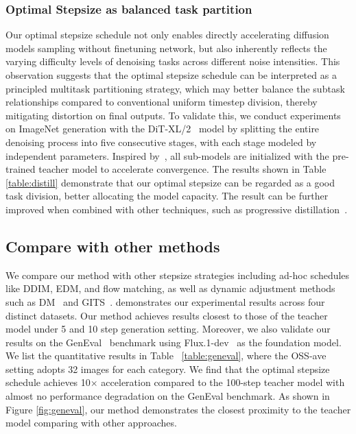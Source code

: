 \documentclass[10pt,twocolumn,letterpaper]{article}
\begin{document}
\subsubsection{Optimal Stepsize as balanced task partition}
Our optimal stepsize schedule not only enables directly accelerating diffusion models sampling without finetuning network, but also inherently reflects the varying difficulty levels of denoising tasks across different noise intensities. This observation suggests that the optimal stepsize schedule can be interpreted as a principled multitask partitioning strategy, which may better balance the subtask relationships compared to conventional uniform timestep division, thereby mitigating distortion on final outputs. To validate this, we conduct experiments on ImageNet generation with the DiT-XL/2~\cite{dit} model by splitting the entire denoising process into five consecutive stages, with each stage modeled by independent parameters. Inspired by~\cite{salimans2022progressive, balaji2022ediff}, all sub-models are initialized with the pre-trained teacher model to accelerate convergence. The results shown in Table \ref{table:distill} demonstrate that our optimal stepsize can be regarded as a good task division, better allocating the model capacity. The result can be further improved when combined with other techniques, such as progressive distillation~\cite{salimans2022progressive}.


    \subsection{Compare with other methods}
    We compare our method with other stepsize strategies including ad-hoc schedules like DDIM, EDM, and flow matching, as well as dynamic adjustment methods such as DM~\cite{dm} and GITS~\cite{gits}.  demonstrates our experimental results across four distinct datasets. Our method achieves results closest to those of the teacher model under 5 and 10 step generation setting. Moreover, we also validate our results on the GenEval~\cite{ghosh2023geneval} benchmark using Flux.1-dev~\cite{flux} as the foundation model. We list the quantitative results in Table ~\ref{table:geneval}, where the OSS-ave setting adopts 32 images for each category. We find that the optimal stepsize schedule achieves 10$\times$ acceleration compared to the 100-step teacher model with almost no performance degradation on the GenEval benchmark. As shown in Figure \ref{fig:geneval}, our method demonstrates the closest proximity to the teacher model comparing with other approaches.
    
\end{document}
